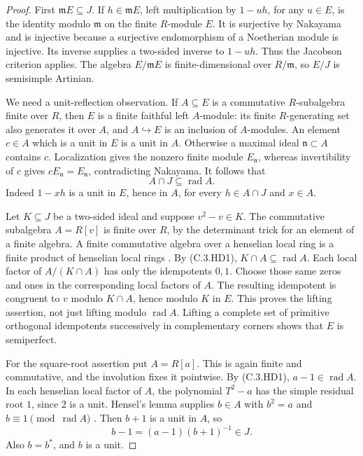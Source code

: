 \begin{proof}
First $\mathfrak mE\subseteq J$.  If $h\in\mathfrak mE$,
left multiplication by $1-uh$, for any $u\in E$, is the
identity modulo $\mathfrak m$ on the finite $R$-module $E$.
It is surjective by Nakayama and is injective because a
surjective endomorphism of a Noetherian module is injective.
Its inverse supplies a two-sided inverse to $1-uh$.
Thus the Jacobson criterion applies.  The algebra
$E/\mathfrak mE$ is finite-dimensional over $R/\mathfrak m$,
so $E/J$ is semisimple Artinian.

We need a unit-reflection observation.  If $A\subseteq E$
is a commutative $R$-subalgebra finite over $R$, then $E$ is
a finite faithful left $A$-module: its finite $R$-generating
set also generates it over $A$, and $A\hookrightarrow E$
is an inclusion of $A$-modules.  An element $c\in A$ which
is a unit in $E$ is a unit in $A$.  Otherwise a maximal
ideal $\mathfrak n\subset A$ contains $c$.  Localization
gives the nonzero finite module $E_{\mathfrak n}$, whereas
invertibility of $c$ gives
$cE_{\mathfrak n}=E_{\mathfrak n}$, contradicting Nakayama.
It follows that
\[
                 A\cap J\subseteq\operatorname{rad}A.       \tag{C.3.HD1}
\]
Indeed $1-xh$ is a unit in $E$, hence in $A$, for every
$h\in A\cap J$ and $x\in A$.

Let $K\subseteq J$ be a two-sided ideal and suppose
$v^2-v\in K$.  The commutative subalgebra $A=R[v]$ is
finite over $R$, by the determinant trick for an element
of a finite algebra.  A finite commutative algebra over a
henselian local ring is a finite product of henselian local
rings \cite[Tag 04GH, Lemma 10.153.4(1)]{C-StacksHenselianEffective}.
By (C.3.HD1), $K\cap A\subseteq\operatorname{rad}A$.
Each local factor of $A/(K\cap A)$ has only the idempotents
$0,1$.  Choose those same zeros and ones in the corresponding
local factors of $A$.  The resulting idempotent is congruent
to $v$ modulo $K\cap A$, hence modulo $K$ in $E$.
This proves the lifting assertion, not just lifting modulo
$\operatorname{rad}A$.  Lifting a complete set of primitive
orthogonal idempotents successively in complementary corners
shows that $E$ is semiperfect.

For the square-root assertion put $A=R[a]$.  This is again
finite and commutative, and the involution fixes it pointwise.
By (C.3.HD1), $a-1\in\operatorname{rad}A$.
In each henselian local factor of $A$, the polynomial
$T^2-a$ has the simple residual root $1$, since $2$ is a
unit.  Hensel's lemma supplies $b\in A$ with
$b^2=a$ and $b\equiv1\pmod{\operatorname{rad}A}$
\cite[Tag 04GG, Lemma 10.153.3(2)]{C-StacksHenselianEffective}.
Then $b+1$ is a unit in $A$, so
\[
                 b-1=(a-1)(b+1)^{-1}\in J.
\]
Also $b=b^*$, and $b$ is a unit.


\end{proof}
